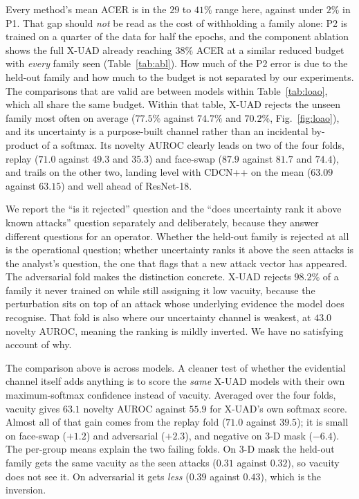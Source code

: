 \documentclass[conference]{IEEEtran}
\begin{document}
Every method's mean ACER is in the $29$ to $41\%$ range here, against under $2\%$
in P1. That gap should \emph{not} be read as the cost of withholding a family
alone: P2 is trained on a quarter of the data for half the epochs, and the
component ablation shows the full X-UAD already reaching $38\%$ ACER at a similar
reduced budget with \emph{every} family seen (Table~\ref{tab:abl}). How much of the
P2 error is due to the held-out family and how much to the budget is not separated
by our experiments. The comparisons that are valid are between models within
Table~\ref{tab:loao}, which all share the same budget. Within that table, X-UAD
rejects the unseen family most often on average ($77.5\%$ against $74.7\%$ and
$70.2\%$, Fig.~\ref{fig:loao}), and its uncertainty is a purpose-built channel
rather than an incidental by-product of a softmax. Its novelty AUROC clearly leads on
two of the four folds, replay ($71.0$ against $49.3$ and $35.3$) and face-swap
($87.9$ against $81.7$ and $74.4$), and trails on the other two, landing level with
CDCN++ on the mean ($63.09$ against $63.15$) and well ahead of ResNet-18.

We report the ``is it rejected'' question and the ``does uncertainty rank it above
known attacks'' question separately and deliberately, because they answer different
questions for an operator. Whether the held-out family is rejected at all is the
operational question; whether uncertainty ranks it above the seen attacks is the
analyst's question, the one that flags that a new attack vector has
appeared. The adversarial fold makes the distinction concrete. X-UAD rejects
$98.2\%$ of a family it never trained on while still assigning it low vacuity,
because the perturbation sits on top of an attack whose underlying evidence the
model does recognise. That fold is also where our uncertainty channel is weakest, at
$43.0$ novelty AUROC, meaning the ranking is mildly inverted. We have no satisfying
account of why.

The comparison above is across models. A cleaner test of whether the evidential
channel itself adds anything is to score the \emph{same} X-UAD models with their
own maximum-softmax confidence instead of vacuity. Averaged over the four folds,
vacuity gives $63.1$ novelty AUROC against $55.9$ for X-UAD's own softmax score.
Almost all of that gain comes from the replay fold ($71.0$ against $39.5$); it is
small on face-swap ($+1.2$) and adversarial ($+2.3$), and negative on 3-D mask
($-6.4$). The per-group means explain the two failing folds. On 3-D mask the
held-out family gets the same vacuity as the seen attacks ($0.31$ against
$0.32$), so vacuity does not see it. On adversarial it gets \emph{less}
($0.39$ against $0.43$), which is the inversion.
\end{document}
